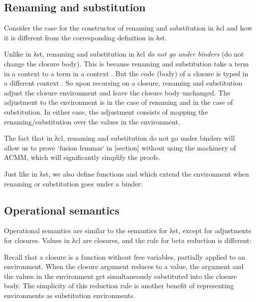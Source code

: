 \documentclass[bsc,frontabs,oneside,singlespacing,parskip,deptreport]{infthesis}
\theoremstyle{definition}
\theoremstyle{lemma}
\begin{document}
\subsection{Renaming and substitution}
\label{sec:renam-subst}

Consider the case for the constructor  of renaming and
substitution in λcl and how it is different from the corresponding
definition in λst.


Unlike in λst, renaming and substitution in λcl \textit{do not go
  under binders} (do not change the closure body). This is because
renaming and substitution take a term in a context  to a term in
a context . But the code (body) of a closure is typed in a
different context . So upon recursing on a closure, renaming and
substitution adjust the closure environment and leave the closure body
unchanged. The adjustment to the environment is 
in the case of renaming and  in the case of
substitution. In either case, the adjustment consists of mapping the
renaming/substitution over the values in the environment.

The fact that in λcl, renaming and substitution do not go under
binders will allow us to prove `fusion lemmas` in [section] without
using the machinery of ACMM, which will significantly simplify the
proofs.

Just like in λst, we also define functions  and 
which extend the environment when renaming or substitution goes under
a binder:


\subsection{Operational semantics}
\label{sec:oper-semant}

Operational semantics are similar to the semantics for λst, except for
adjustments for closures. Values in λcl are closures, and the rule for
beta reduction is different:


Recall that a closure is a function without free variables,
partially applied to an environment. When the closure argument reduces
to a value, the argument and the values in the environment get
simultaneously substituted into the closure body. The simplicity of
this reduction rule is another benefit of representing environments as
substitution environments.
\end{document}

